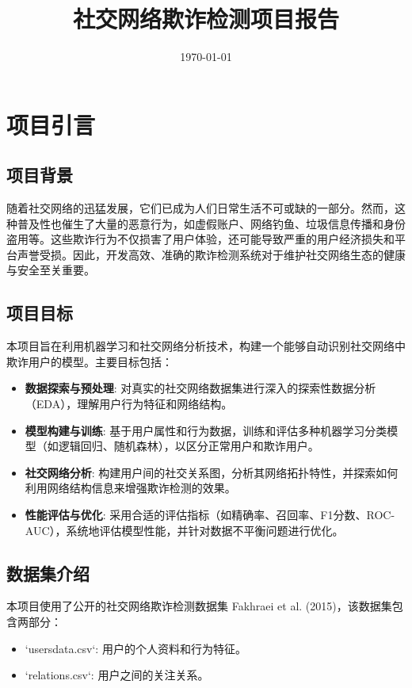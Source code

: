 \documentclass[UTF8]{ctexart}
\title{社交网络欺诈检测项目报告}
\author{}
\date{\today}
\begin{document}
\maketitle

\tableofcontents


\section{项目引言}

\subsection{项目背景}

随着社交网络的迅猛发展，它们已成为人们日常生活不可或缺的一部分。然而，这种普及性也催生了大量的恶意行为，如虚假账户、网络钓鱼、垃圾信息传播和身份盗用等。这些欺诈行为不仅损害了用户体验，还可能导致严重的用户经济损失和平台声誉受损。因此，开发高效、准确的欺诈检测系统对于维护社交网络生态的健康与安全至关重要。

\subsection{项目目标}

本项目旨在利用机器学习和社交网络分析技术，构建一个能够自动识别社交网络中欺诈用户的模型。主要目标包括：

\begin{itemize}
    \item \textbf{数据探索与预处理}: 对真实的社交网络数据集进行深入的探索性数据分析（EDA），理解用户行为特征和网络结构。
    \item \textbf{模型构建与训练}: 基于用户属性和行为数据，训练和评估多种机器学习分类模型（如逻辑回归、随机森林），以区分正常用户和欺诈用户。
    \item \textbf{社交网络分析}: 构建用户间的社交关系图，分析其网络拓扑特性，并探索如何利用网络结构信息来增强欺诈检测的效果。
    \item \textbf{性能评估与优化}: 采用合适的评估指标（如精确率、召回率、F1分数、ROC-AUC），系统地评估模型性能，并针对数据不平衡问题进行优化。
\end{itemize}

\subsection{数据集介绍}

本项目使用了公开的社交网络欺诈检测数据集 Fakhraei et al. (2015)，该数据集包含两部分：
\begin{itemize}
    \item `usersdata.csv`: 用户的个人资料和行为特征。
    \item `relations.csv`: 用户之间的关注关系。
\end{itemize}
\end{document}
